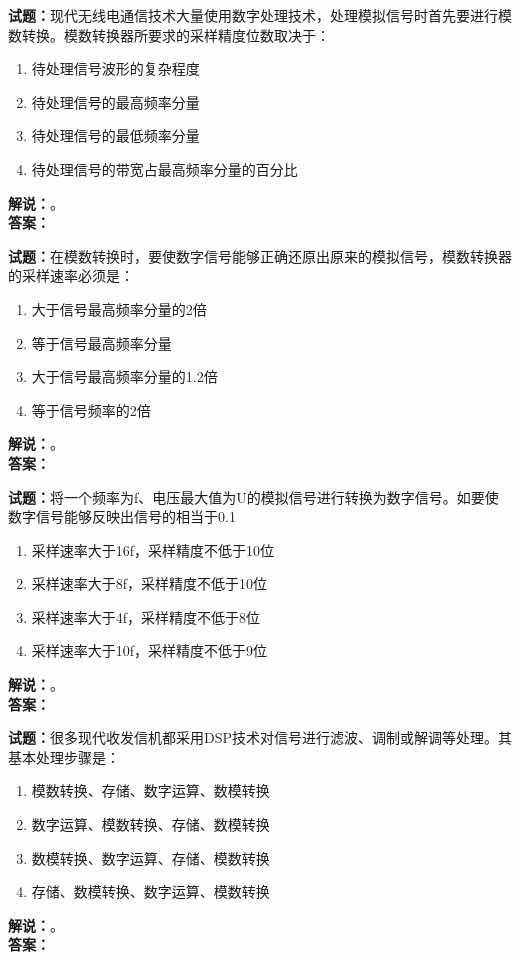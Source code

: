 \documentclass{ctexbook}
\begin{document}
\vspace{\baselineskip}

\noindent\textbf{试题：}现代无线电通信技术大量使用数字处理技术，处理模拟信号时首先要进行模数转换。模数转换器所要求的采样精度位数取决于：
\begin{enumerate}[leftmargin=3em]
  \item 待处理信号波形的复杂程度
  \item 待处理信号的最高频率分量
  \item 待处理信号的最低频率分量
  \item 待处理信号的带宽占最高频率分量的百分比
\end{enumerate}
\noindent\textbf{解说：}\textbf{}。\\\noindent\textbf{答案：}

\vspace{\baselineskip}

\noindent\textbf{试题：}在模数转换时，要使数字信号能够正确还原出原来的模拟信号，模数转换器的采样速率必须是：
\begin{enumerate}[leftmargin=3em]
  \item 大于信号最高频率分量的2倍
  \item 等于信号最高频率分量
  \item 大于信号最高频率分量的1.2倍
  \item 等于信号频率的2倍
\end{enumerate}
\noindent\textbf{解说：}\textbf{}。\\\noindent\textbf{答案：}

\vspace{\baselineskip}

\noindent\textbf{试题：}将一个频率为f、电压最大值为U的模拟信号进行转换为数字信号。如要使数字信号能够反映出信号的相当于0.1%
\begin{enumerate}[leftmargin=3em]
  \item 采样速率大于16f，采样精度不低于10位
  \item 采样速率大于8f，采样精度不低于10位
  \item 采样速率大于4f，采样精度不低于8位
  \item 采样速率大于10f，采样精度不低于9位
\end{enumerate}
\noindent\textbf{解说：}\textbf{}。\\\noindent\textbf{答案：}

\vspace{\baselineskip}

\noindent\textbf{试题：}很多现代收发信机都采用DSP技术对信号进行滤波、调制或解调等处理。其基本处理步骤是：
\begin{enumerate}[leftmargin=3em]
  \item 模数转换、存储、数字运算、数模转换
  \item 数字运算、模数转换、存储、数模转换
  \item 数模转换、数字运算、存储、模数转换
  \item 存储、数模转换、数字运算、模数转换
\end{enumerate}
\noindent\textbf{解说：}\textbf{}。\\\noindent\textbf{答案：}
\end{document}

